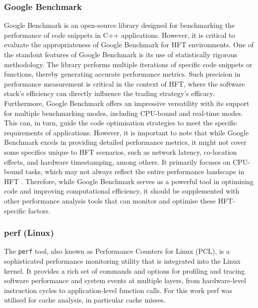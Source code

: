 \documentclass{article}
\theoremstyle{break}
\begin{document}
\subsubsection*{Google Benchmark}
Google Benchmark is an open-source library designed for benchmarking the performance of code snippets in C++ applications. However, it is critical to evaluate the appropriateness of Google Benchmark for HFT environments. One of the standout features of Google Benchmark is its use of statistically rigorous methodology. The library performs multiple iterations of specific code snippets or functions, thereby generating accurate performance metrics. Such precision in performance measurement is critical in the context of HFT, where the software stack's efficiency can directly influence the trading strategy's efficacy. Furthermore, Google Benchmark offers an impressive versatility with its support for multiple benchmarking modes, including CPU-bound and real-time modes. This can, in turn, guide the code optimisation strategies to meet the specific requirements of applications. However, it is important to note that while Google Benchmark excels in providing detailed performance metrics, it might not cover some specifics unique to HFT scenarios, such as network latency, co-location effects, and hardware timestamping, among others. It primarily focuses on CPU-bound tasks, which may not always reflect the entire performance landscape in HFT \cite{Lilja}. Therefore, while Google Benchmark serves as a powerful tool in optimising code and improving computational efficiency, it should be supplemented with other performance analysis tools that can monitor and optimise these HFT-specific factors.
\subsubsection*{perf (Linux)}
The \texttt{perf} tool, also known as Performance Counters for Linux (PCL), is a sophisticated performance monitoring utility that is integrated into the Linux kernel. It provides a rich set of commands and options for profiling and tracing software performance and system events at multiple layers, from hardware-level instruction cycles to application-level function calls. For this work perf was utilised for cache analysis, in particular cache misses.
\end{document}
